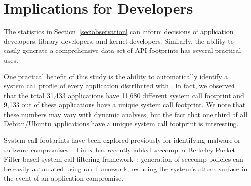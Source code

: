 \section{Implications for Developers}
\label{sec:syspop:analysis}

The statistics in Section~\ref{sec:observation} can inform decisions of application developers, library developers,
and kernel developers.  Similarly, the ability to easily generate a comprehensive data set of API footprints
has several practical uses.



One practical benefit of this study is the ability to automatically identify a system call profile of
every application distributed with \osdist{}. In fact, we observed that the total 31,433 applications 
have 11,680 different system call footprint and 9,133 out of these applications have a unique system call footprint.
We note that these numbers may vary with dynamic analyses, but the fact that one third of all Debian/Ubuntu applications
have a unique system call footprint is interesting.

System call footprints have been explored previously for identifying malware or software compromises~\citep{policy-extraction}. %
Linux has recently added seccomp, a Berkeley Packet Filter-based system call filtering framework~\citep{seccomp};
generation of seccomp policies can be easily automated using our framework,
reducing the system's attack surface in the event of an application compromise.


